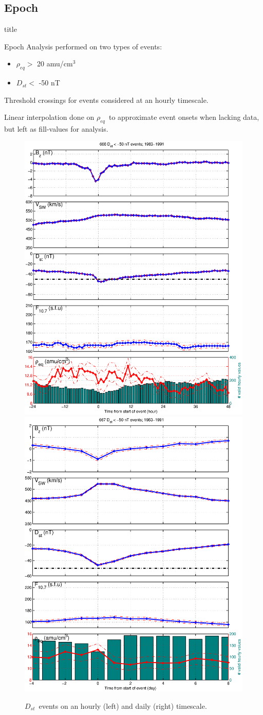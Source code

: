 \documentclass[xcolor={dvipsnames,table}]{beamer}
\newcommand{\subheader}{    		\begin{center}
  	\begin{beamercolorbox}[sep=4pt,center,shadow=true,rounded=true]{title}
  		\usebeamerfont{title}\subsecname\par%
  	\end{beamercolorbox}
  	\vfill
  	\end{center}}
\newcommand{\req}{\ensuremath{\rho_{eq}}} %
\newcommand{\dst}{\ensuremath{D_{st}}} %
\begin{document}
\subsection{Epoch}

\begin{frame}
	\subheader
	Epoch Analysis performed on two types of events:
	\begin{itemize}
		\item $\req >$ 20 amu/cm$^3$
		\item $\dst <$ -50 nT
	\end{itemize}
	Threshold crossings for events considered at an hourly timescale.
	\newline
	
	Linear interpolation done on \req\ to approximate event onsets when lacking data, but left as fill-values for analysis. 
\end{frame}


\begin{frame}
	\begin{figure}[htp!]
		\centering
		\includegraphics[width=0.5\linewidth]{Figures/StormAvs/stormavs-dst}
		\includegraphics[width=0.5\linewidth]{Figures/StormAvs/stormavs-dst-day-GOES6}
		\caption{\dst\ events on an hourly (left) and daily (right) timescale.}
		\label{fig:EpochDst}
	\end{figure}
\end{frame}
\end{document}
